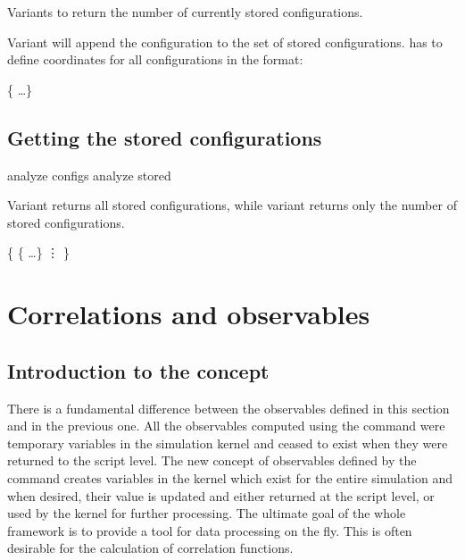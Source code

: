 Variants  to  return the number of currently
stored configurations.

Variant  will append the configuration  to the
set of stored configurations.  has to define coordinates
for all configurations in the format:
\begin{code}
 \{      \dots \}
\end{code}

\subsection{Getting the stored configurations}
\label{analyze:configs}
\label{analyze:stored}
\begin{essyntax}
   analyze configs
   analyze stored 
\end{essyntax}

Variant  returns all stored configurations, while variant
 returns only the number of stored configurations.

\begin{code}
\{
  \{      \dots \}
  \vdots
\}
\end{code}


\section{Correlations and observables}

\subsection{Introduction to the concept}
There is a fundamental difference between the observables defined in this
section and in the previous one. All the observables computed using the
 command were temporary variables in the simulation kernel
and ceased to exist when they were returned to the script level.
The new concept of observables defined by the  command
creates variables in the kernel which exist for the entire simulation 
and when desired, their value is updated and either returned at the 
script level, or used by the kernel for further processing.
The ultimate goal of the whole framework is to provide a tool for
data processing on the fly. This is often desirable for 
the calculation of correlation functions. 

